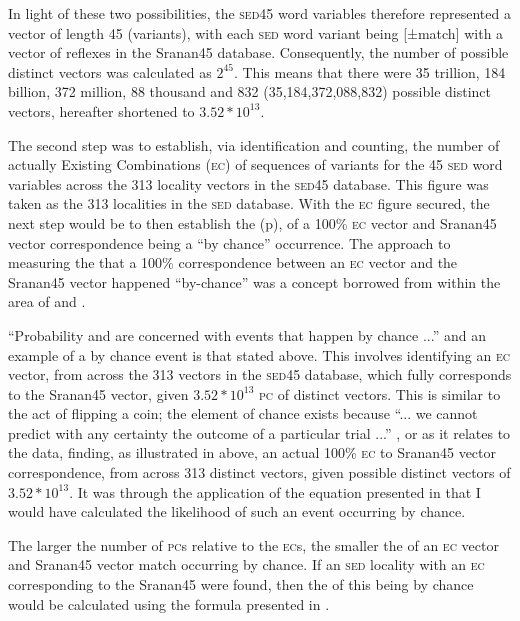 {{{In light of these two possibilities, the \textsc{sed45} word variables therefore represented a vector of length 45 (variants), with each \textsc{sed} word variant being [±match] with a vector of reflexes in the Sranan45 database. Consequently, the number of possible distinct vectors was calculated as $2^{45}$. This means that there were 35 trillion, 184 billion, 372 million, 88 thousand and 832 (35,184,372,088,832) possible distinct vectors, hereafter shortened to $3.52\ast10^{13}$.

The second step was to establish, via identification and counting, the number of actually Existing Combinations (\textsc{ec}) of sequences of variants for the 45 \textsc{sed} word variables across the 313 locality vectors in the \textsc{sed45} database. This figure was taken as the 313 localities in the \textsc{sed} database. With the \textsc{ec} figure secured, the next step would be to then establish the  (p), of a 100\% \textsc{ec} vector and Sranan45 vector correspondence being a ``by chance'' occurrence. The approach to measuring the  that a 100\% correspondence between an \textsc{ec} vector and the Sranan45 vector happened ``by-chance'' was a concept borrowed from within the area of  and .

``Probability and  are concerned with events that happen by chance ...''  \citep[1]{DeCoursey03} and an example of a by chance event is that stated above. This involves identifying an \textsc{ec} vector, from across the 313 vectors in the \textsc{sed45} database, which fully corresponds to the Sranan45 vector, given $3.52\ast10^{13}$ \textsc{pc} of distinct vectors. This is similar to the act of flipping a coin; the element of chance exists because ``... we cannot predict with any certainty the outcome of a particular trial ...'' \citep[1]{DeCoursey03}, or as it relates to the data, finding, as illustrated in  above, an actual 100\% \textsc{ec} to Sranan45 vector correspondence, from across 313 distinct vectors, given possible distinct vectors of $3.52\ast10^{13}$. It was through the application of the  equation presented in  that I would have calculated the likelihood of such an event occurring by chance.

The larger the number of \textsc{pc}s relative to the \textsc{ec}s, the smaller the  of an \textsc{ec} vector and Sranan45 vector match occurring by chance. If an \textsc{sed} locality with an \textsc{ec} corresponding to the Sranan45 were found, then the  of this being by chance would be calculated using the formula presented in .

}}}
